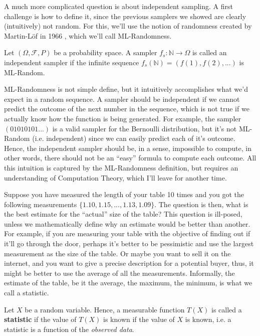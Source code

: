\begin{shaded}
	A much more complicated question is about independent sampling.
	A first challenge is how to define it, since the previous samplers
	we showed are clearly (intuitively) not random. For this, we'll
	use the notion of randomness created by Martin-L\"of in 1966 \citep{martin1966}, which
	we'll call ML-Randomness.

	\begin{definition}
		Let $(\Omega, \mathcal F, P)$ be a probability space. A
		sampler $f_s:\mathbb N \to \Omega$ is called an
		independent sampler if the infinite sequence $f_s(\mathbb N) = (f(1),f(2),...)$
		is ML-Random.
	\end{definition}

	ML-Randomness is not simple define, but it intuitively accomplishes what we'd expect
	in a random sequence. A sampler should be independent if we cannot predict the outcome
	of the next number in the sequence, which is not true if we actually know how the
	function is being generated. For example, the sampler $(01010101...)$ is a valid
	sampler for the Bernoulli distribution, but it's not ML-Random (i.e. independent) since
	we can easily predict each of it's outcome. Hence, the independent sampler should
	be, in a sense, impossible to compute, in other words, there should not be an ``easy''
	formula to compute each outcome. All this intuition is captured by the ML-Randomness
	definition, but requires an understanding of Computation Theory, which I'll leave for another
	time.

\end{shaded}


Suppose you have measured the length of your table 10 times and you got the following measurements
$\{1.10,1.15,...,1.13,1.09\}$. The question is then, what is the best estimate
for the ``actual'' size of the table?
This question is ill-posed, unless we mathematically define why an estimate would be better
than another. For example, if you are measuring your table with the objective of finding out
if it'll go through the door, perhaps it's better to be pessimistic
and use the largest measurement as the size of the table. Or maybe you want to sell it on the internet,
and you want to give a precise description for a potential buyer, thus, it might be better to use
the average of all the measurements. Informally, the estimate of the table, be it the average, the
maximum, the minimum, is what we call a statistic.

\begin{definition}
	Let $X$ be a random variable. Hence, a measurable function $T(X)$ is called a \textbf{statistic}
	if the value of $T(X)$ is known if the value of $X$ is known, i.e.
	a statistic is a function of the \textit{observed data}.
\end{definition}

